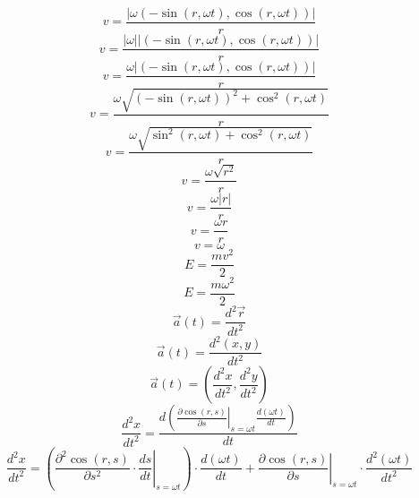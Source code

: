 \documentclass[a4paper,12pt]{report}
\begin{document}
\begin{equation}
v = \frac{\left|\omega \left(-\sin(r,\omega t),\cos(r,\omega t)\right)\right|}{r}
\end{equation}
\begin{equation}
v = \frac{\left|\omega\right| \left|\left(-\sin(r,\omega t),\cos(r,\omega t)\right)\right|}{r}
\end{equation}
\begin{equation}
v = \frac{\omega \left|\left(-\sin(r,\omega t),\cos(r,\omega t)\right)\right|}{r}
\end{equation}
\begin{equation}
v = \frac{\omega \sqrt{(-\sin(r,\omega t))^2 + \cos^2(r,\omega t)}}{r}
\end{equation}
\begin{equation}
v = \frac{\omega \sqrt{\sin^2(r,\omega t) + \cos^2(r,\omega t)}}{r}
\end{equation}
\begin{equation}
v = \frac{\omega \sqrt{r^2}}{r}
\end{equation}
\begin{equation}
v = \frac{\omega \left|r\right|}{r}
\end{equation}
\begin{equation}
v = \frac{\omega r}{r}
\end{equation}
\begin{equation}
v = \omega
\end{equation}
\begin{equation}
E = \frac{mv^2}{2}
\end{equation}
\begin{equation}
E = \frac{m \omega^2}{2}
\end{equation}
\begin{equation}
\vec{a}(t) = \frac{d^2 \vec{r}}{dt^2}
\end{equation}
\begin{equation}
\vec{a}(t) = \frac{d^2 (x,y)}{dt^2}
\end{equation}
\begin{equation}
\vec{a}(t) = \left(\frac{d^2x}{dt^2},\frac{d^2y}{dt^2}\right)
\end{equation}
\begin{equation}
\frac{d^2x}{dt^2} = \frac{d \left(\left.\frac{\partial \cos(r,s)}{\partial s}\right|_{s = \omega t} \frac{d (\omega t)}{dt}\right)}{dt}
\end{equation}
\begin{equation}
\frac{d^2x}{dt^2} = \left(\left.\frac{\partial^2 \cos(r,s)}{\partial s^2} \cdot \frac{ds}{dt}\right|_{s = \omega t}\right) \cdot \frac{d (\omega t)}{dt} + \left.\frac{\partial \cos(r,s)}{\partial s}\right|_{s = \omega t} \cdot \frac{d^2 (\omega t)}{dt^2}
\end{equation}
\end{document}
